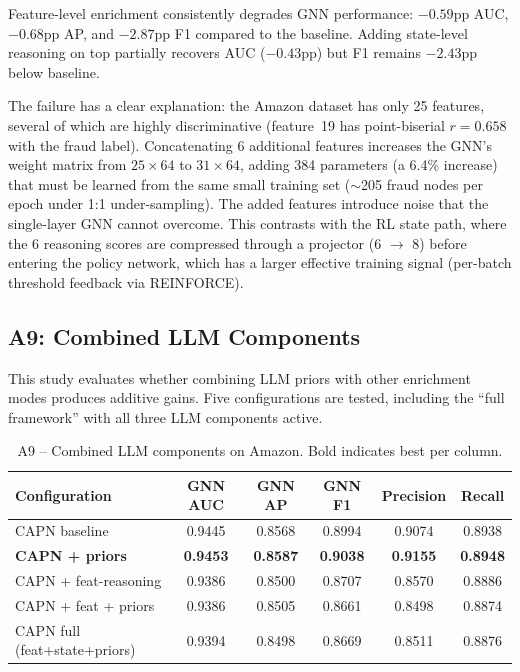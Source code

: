 \noindent
Feature-level enrichment consistently degrades GNN performance: $-0.59$pp AUC, $-0.68$pp AP, and $-2.87$pp F1 compared to the baseline. Adding state-level reasoning on top partially recovers AUC ($-0.43$pp) but F1 remains $-2.43$pp below baseline.

The failure has a clear explanation: the Amazon dataset has only 25 features, several of which are highly discriminative (feature~19 has point-biserial $r = 0.658$ with the fraud label). Concatenating 6 additional features increases the GNN's weight matrix from $25 \times 64$ to $31 \times 64$, adding 384 parameters (a 6.4\% increase) that must be learned from the same small training set ($\sim$205 fraud nodes per epoch under 1:1 under-sampling). The added features introduce noise that the single-layer GNN cannot overcome. This contrasts with the RL state path, where the 6 reasoning scores are compressed through a projector (6 $\to$ 8) before entering the policy network, which has a larger effective training signal (per-batch threshold feedback via REINFORCE).

\subsection{A9: Combined LLM Components}

This study evaluates whether combining LLM priors with other enrichment modes produces additive gains. Five configurations are tested, including the ``full framework'' with all three LLM components active.

\begin{table}[h!]
\centering
\begin{tabular}{lccccc}
\toprule
\textbf{Configuration} & \textbf{GNN AUC} & \textbf{GNN AP} & \textbf{GNN F1} & \textbf{Precision} & \textbf{Recall} \\
\midrule
CAPN baseline & 0.9445 & 0.8568 & 0.8994 & 0.9074 & 0.8938 \\
\textbf{CAPN + priors} & \textbf{0.9453} & \textbf{0.8587} & \textbf{0.9038} & \textbf{0.9155} & \textbf{0.8948} \\
CAPN + feat-reasoning & 0.9386 & 0.8500 & 0.8707 & 0.8570 & 0.8886 \\
CAPN + feat + priors & 0.9386 & 0.8505 & 0.8661 & 0.8498 & 0.8874 \\
CAPN full (feat+state+priors) & 0.9394 & 0.8498 & 0.8669 & 0.8511 & 0.8876 \\
\bottomrule
\end{tabular}
\caption{A9 -- Combined LLM components on Amazon. Bold indicates best per column.}
\label{tab:a9-combined}
\end{table}

